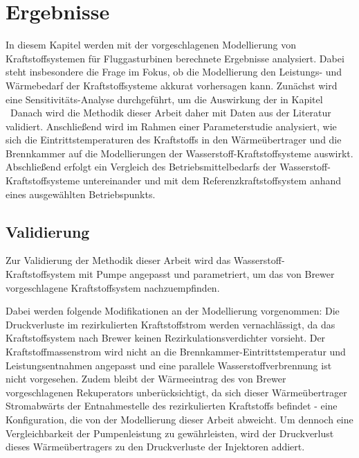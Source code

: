 \chapter{Ergebnisse} \label{chap:ergebnis}

In diesem Kapitel werden mit der vorgeschlagenen Modellierung von Kraftstoffsystemen für Fluggasturbinen berechnete Ergebnisse analysiert. Dabei steht insbesondere die Frage im Fokus, ob die Modellierung den Leistungs- und Wärmebedarf der Kraftstoffsysteme akkurat vorhersagen kann. Zunächst wird eine Sensitivitäts-Analyse durchgeführt, um die Auswirkung der in Kapitel \  Danach wird die Methodik dieser Arbeit daher mit Daten aus der Literatur validiert. Anschließend wird im Rahmen einer Parameterstudie analysiert, wie sich die Eintrittstemperaturen des Kraftstoffs in den Wärmeübertrager und die Brennkammer auf die Modellierungen der Wasserstoff-Kraftstoffsysteme auswirkt. Abschließend erfolgt ein Vergleich des Betriebsmittelbedarfs der Wasserstoff-Kraftstoffsysteme untereinander und mit dem Referenzkraftstoffsystem anhand eines ausgewählten Betriebspunkts.

\section{Validierung}

Zur Validierung der Methodik dieser Arbeit wird das Wasserstoff-Kraftstoffsystem mit Pumpe angepasst und parametriert, um das von Brewer \cite{Brewer.1991} vorgeschlagene Kraftstoffsystem nachzuempfinden. 

Dabei werden folgende Modifikationen an der Modellierung vorgenommen: Die Druckverluste im rezirkulierten Kraftstoffstrom werden vernachlässigt, da das Kraftstoffsystem nach Brewer keinen Rezirkulationsverdichter vorsieht. Der Kraftstoffmassenstrom wird nicht an die Brennkammer-Eintrittstemperatur und Leistungsentnahmen angepasst und eine parallele Wasserstoffverbrennung ist nicht vorgesehen. Zudem bleibt der Wärmeeintrag des von Brewer vorgeschlagenen Rekuperators unberücksichtigt, da sich dieser Wärmeübertrager Stromabwärts der Entnahmestelle des rezirkulierten Kraftstoffs befindet - eine Konfiguration, die von der Modellierung dieser Arbeit abweicht. Um dennoch eine Vergleichbarkeit der Pumpenleistung zu gewährleisten, wird der Druckverlust dieses Wärmeübertragers zu den Druckverluste der Injektoren addiert. 

